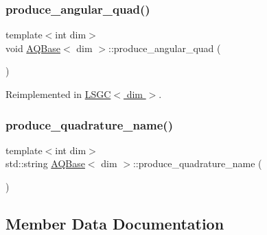 \mbox{\label{class_a_q_base_a16c7871be0da6c112f547f39d50258fd}} 
\subsubsection{\texorpdfstring{produce\+\_\+angular\+\_\+quad()}{produce\_angular\_quad()}}
{\footnotesize\ttfamily template$<$int dim$>$ \\
void \hyperlink{class_a_q_base}{A\+Q\+Base}$<$ dim $>$\+::produce\+\_\+angular\+\_\+quad (\begin{DoxyParamCaption}{ }\end{DoxyParamCaption})\hspace{0.3cm}{\ttfamily [virtual]}}



Reimplemented in \hyperlink{class_l_s_g_c_a1d135fb9ca12a9b65b8cc397479fc4d7}{L\+S\+G\+C$<$ dim $>$}.

\mbox{\label{class_a_q_base_a4ae1370033705c82d08686fd651ad6e8}} 
\subsubsection{\texorpdfstring{produce\+\_\+quadrature\+\_\+name()}{produce\_quadrature\_name()}}
{\footnotesize\ttfamily template$<$int dim$>$ \\
std\+::string \hyperlink{class_a_q_base}{A\+Q\+Base}$<$ dim $>$\+::produce\+\_\+quadrature\+\_\+name (\begin{DoxyParamCaption}{ }\end{DoxyParamCaption})\hspace{0.3cm}{\ttfamily [private]}}



\subsection{Member Data Documentation}
\mbox{\label{class_a_q_base_a3e50d2d59d1a4a2fabed3c4852f80c49}} 
